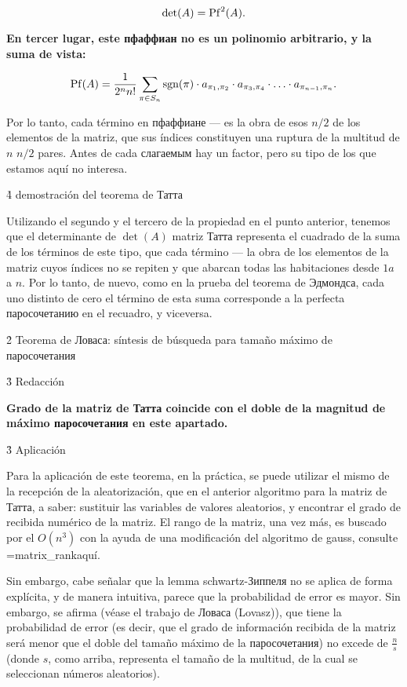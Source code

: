 $$ \det(A) = {\rm Pf}^2(A). $$

\bf{En tercer lugar}, este пфаффиан no es un polinomio arbitrario, y la suma de vista:

$$ {\rm Pf}(A) = \frac{ 1 }{ 2^n n! } \sum_{\pi \in S_n} {\rm sgn(\pi)} \cdot a_{\pi_1,\pi_2} \cdot a_{\pi_3,\pi_4} \cdot \ldots \cdot a_{\pi_{n-1},\pi_n}. $$

Por lo tanto, cada término en пфаффиане --- es la obra de esos $n/2$ de los elementos de la matriz, que sus índices constituyen una ruptura de la multitud de $n$ $n/2$ pares. Antes de cada слагаемым hay un factor, pero su tipo de los que estamos aquí no interesa.


\h4{ demostración del teorema de Татта }

Utilizando el segundo y el tercero de la propiedad en el punto anterior, tenemos que el determinante de $\det(A)$ matriz Татта representa el cuadrado de la suma de los términos de este tipo, que cada término --- la obra de los elementos de la matriz cuyos índices no se repiten y que abarcan todas las habitaciones desde $1 a$ a $n$. Por lo tanto, de nuevo, como en la prueba del teorema de Эдмондса, cada uno distinto de cero el término de esta suma corresponde a la perfecta паросочетанию en el recuadro, y viceversa.


\h2{ Teorema de Ловаса: síntesis de búsqueda para tamaño máximo de паросочетания }


\h3{ Redacción }

\bf{Grado} de la matriz de Татта coincide con el doble de la magnitud de \bf{máximo паросочетания} en este apartado.


\h3{ Aplicación }

Para la aplicación de este teorema, en la práctica, se puede utilizar el mismo de la recepción de la aleatorización, que en el anterior algoritmo para la matriz de Татта, a saber: sustituir las variables de valores aleatorios, y encontrar el grado de recibida numérico de la matriz. El rango de la matriz, una vez más, es buscado por el $O (n^3)$ con la ayuda de una modificación del algoritmo de gauss, consulte \algohref=matrix_rank{aquí}.

Sin embargo, cabe señalar que la lemma schwartz-Зиппеля no se aplica de forma explícita, y de manera intuitiva, parece que la probabilidad de error es mayor. Sin embargo, se afirma (véase el trabajo de Ловаса (Lovasz)), que tiene la probabilidad de error (es decir, que el grado de información recibida de la matriz será menor que el doble del tamaño máximo de la паросочетания) no excede de $\frac{n}{s}$ (donde $s$, como arriba, representa el tamaño de la multitud, de la cual se seleccionan números aleatorios).


